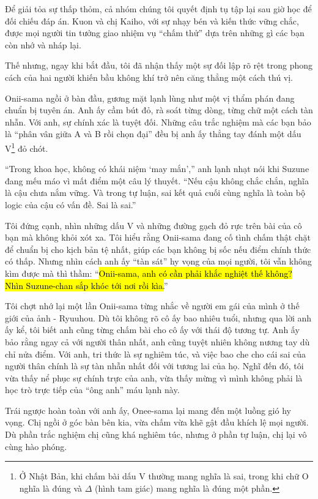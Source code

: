 \documentclass[../main.tex]{subfiles}
\begin{document}
Để giải tỏa sự thấp thỏm, cả nhóm chúng tôi quyết định tụ tập lại sau giờ học để đối chiếu đáp án. Kuon và chị Kaiho, với sự nhạy bén và kiến thức vững chắc, được mọi người tin tưởng giao nhiệm vụ ``chấm thử'' dựa trên những gì các bạn còn nhớ và nháp lại.

Thế nhưng, ngay khi bắt đầu, tôi đã nhận thấy một sự đối lập rõ rệt trong phong cách của hai người khiến bầu không khí trở nên căng thẳng một cách thú vị.

Onii-sama ngồi ở bàn đầu, gương mặt lạnh lùng như một vị thẩm phán đang chuẩn bị tuyên án. Anh ấy cầm bút đỏ, rà soát từng dòng, từng chữ một cách tàn nhẫn. Với anh, sự chính xác là tuyệt đối. Những câu trắc nghiệm mà các bạn bảo là ``phân vân giữa A và B rồi chọn đại'' đều bị anh ấy thẳng tay đánh một dấu V\footnote{Ở Nhật Bản, khi chấm bài dấu V thường mang nghĩa là sai, trong khi chữ O nghĩa là đúng và $\Delta$ (hình tam giác) mang nghĩa là đúng một phần.} đỏ chót.

``Trong khoa học, không có khái niệm `may mắn','' anh lạnh nhạt nói khi Suzune đang mếu máo vì mất điểm một câu lý thuyết. ``Nếu cậu không chắc chắn, nghĩa là cậu chưa nắm vững. Và trong tự luận, sai kết quả cuối cùng nghĩa là toàn bộ logic của cậu có vấn đề. Sai là sai.''

Tôi đứng cạnh, nhìn những dấu V và những đường gạch đỏ rực trên bài của cô bạn mà không khỏi xót xa. Tôi hiểu rằng Onii-sama đang cố tình chấm thật chặt để chuẩn bị cho kịch bản tệ nhất, giúp các bạn không bị sốc nếu điểm chính thức có thấp. Nhưng nhìn cách anh ấy ``tàn sát'' hy vọng của mọi người, tôi vẫn không kìm được mà thì thầm: ``\hl{Onii-sama, anh có cần phải khắc nghiệt thế không? Nhìn Suzune-chan sắp khóc tới nơi rồi kìa.}''

Tôi chợt nhớ lại một lần Onii-sama từng nhắc về người em gái của mình ở thế giới của ảnh - Ryuuhou. Dù tôi không rõ cô ấy bao nhiêu tuổi, nhưng qua lời anh ấy kể, tôi biết anh cũng từng chấm bài cho cô ấy với thái độ tương tự. Anh ấy bảo rằng ngay cả với người thân nhất, anh cũng tuyệt nhiên không nương tay dù chỉ nửa điểm. Với anh, tri thức là sự nghiêm túc, và việc bao che cho cái sai của người thân chính là sự tàn nhẫn nhất đối với tương lai của họ. Nghĩ đến đó, tôi vừa thấy nể phục sự chính trực của anh, vừa thấy mừng vì mình không phải là học trò trực tiếp của ``ông anh'' máu lạnh này.

Trái ngược hoàn toàn với anh ấy, Onee-sama lại mang đến một luồng gió hy vọng. Chị ngồi ở góc bàn bên kia, vừa chấm vừa khẽ gật đầu khích lệ mọi người. Dù phần trắc nghiệm chị cũng khá nghiêm túc, nhưng ở phần tự luận, chị lại vô cùng hào phóng.
\end{document}

